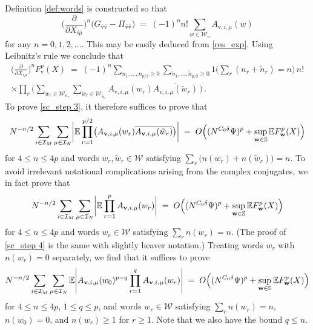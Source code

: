 \documentclass[11pt]{article} %
\newcommand{\nc}{\normalcolor}
\numberwithin{equation}{section}
\numberwithin{figure}{section}
\theoremstyle{plain} %
\theoremstyle{definition} %
\newcommand{\f}[1]{\boldsymbol{\mathrm{#1}}} %
\newcommand{\bb}{\mathbb} %
\renewcommand{\cal}{\mathcal}
\newcommand{\ol}[1]{\overline{#1} \!\,} %
\newcommand{\E}{\mathbb{E}}
\renewcommand{\leq}{\leqslant}
\renewcommand{\geq}{\geqslant}
\newcommand{\indbb}[1]{\f 1 \pbb{#1}}
\newcommand{\pb}[1]{\bigl({#1}\bigr)}
\newcommand{\pB}[1]{\Bigl({#1}\Bigr)}
\newcommand{\pbb}[1]{\biggl({#1}\biggr)}
\newcommand{\pBB}[1]{\Biggl({#1}\Biggr)}
\newcommand{\absbb}[1]{\biggl\lvert #1 \biggr\rvert}
\newcommand{\absBB}[1]{\Biggl\lvert #1 \Biggr\rvert}
\begin{document}
Definition \ref{def:words} is constructed so that
\begin{equation*}
\pbb{\frac{\partial}{\partial X_{i \mu}}}^n \pb{G_{\bar {\f v} \bar {\f v}} - \Pi_{\bar {\f v} \bar {\f v}}} \;=\; (-1)^n n! \sum_{w \in \cal W_n} A_{\f v,i,\mu}(w)
\end{equation*}
for any $n = 0,1,2,\dots$. This may be easily deduced from \eqref{res_exp}. Using Leibnitz's rule \nc we conclude that
\begin{multline*}
\pbb{\frac{\partial}{\partial X_{i \mu}}}^n F^p_{\f v}(X) \;=\; (-1)^n \sum_{n_1, \dots, n_{p/2} \geq 0} \sum_{\tilde n_1, \dots, \tilde n_{p/2} \geq 0} \indbb{\sum_r (n_r + \tilde n_r) = n} \, n!
\\
\times \prod_{r} \pBB{\sum_{w_r \in \cal W_{n_r}} \sum_{\tilde w_r \in \cal W_{\tilde n_r}} A_{\f v,i, \mu}(w_r) \ol{A_{\f v,i, \mu}(\tilde w_r)}}\,.
\end{multline*}
To prove \eqref{sc_step 3}, it therefore suffices to prove that
\begin{equation} \label{sc_step 4}
N^{-n/2} \sum_{i \in \cal I_M} \sum_{\mu \in \cal I_N} \absbb{\E \prod_{r = 1}^{p/2} \pb{A_{\f v,i, \mu}(w_r) \ol{A_{\f v,i, \mu}(\tilde w_r)}}} \;=\; O \pB{(N^{C_0 \delta}\Psi)^p+\sup_{\f w \in \bb S} \E F^p_{\f w}(X)}
\end{equation}
for $4 \leq n \leq 4p$ and words $w_r, \tilde w_r \in \cal W$ satisfying $\sum_{r} \pb{n(w_r) + n(\tilde w_r)} = n$. To avoid irrelevant notational complications arising from the complex conjugates, we in fact prove that
\begin{equation} \label{sc_step 5}
N^{-n/2} \sum_{i \in \cal I_M} \sum_{\mu \in \cal I_N} \absbb{\E \prod_{r = 1}^{p} A_{\f v,i, \mu}(w_r)} \;=\; O \pB{(N^{C_0 \delta}\Psi)^p+\sup_{\f w \in \bb S} \E F^p_{\f w}(X)}
\end{equation}
for $4 \leq n \leq 4p$ and words $w_r \in \cal W$ satisfying $\sum_{r} n(w_r) = n$. (The proof of \eqref{sc_step 4} is the same with slightly heaver notation.) Treating words $w_r$ with $n(w_r) = 0$ separately, we find that it suffices to prove
\begin{equation} \label{sc_step 6}
N^{-n/2} \sum_{i \in \cal I_M} \sum_{\mu \in \cal I_N} \E \absBB{A_{\f v,i, \mu}(w_0)^{p - q} \prod_{r = 1}^{q} A_{\f v,i, \mu}(w_r)} \;=\; O \pB{(N^{C_0 \delta}\Psi)^p+\sup_{\f w \in \bb S} \E F^p_{\f w}(X)}
\end{equation}
for $4 \leq n \leq 4p$, $1 \leq q \leq p$, and words $w_r \in \cal W$ satisfying $\sum_{r} n(w_r) = n$, $n(w_0) = 0$, and $n(w_r) \geq 1$ for $r \geq 1$. Note that we also have the bound $q \leq n$.
\end{document}
